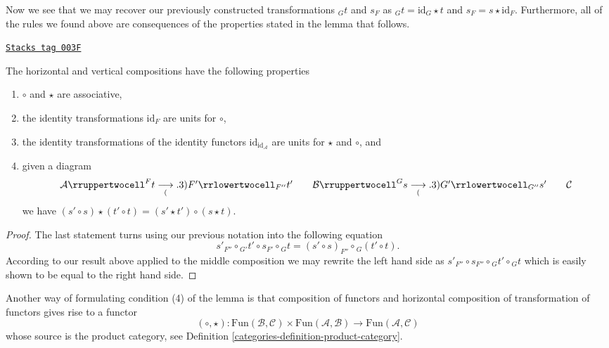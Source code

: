 Now we see that we may recover our previously constructed
transformations ${}_Gt$ and $s_F$ as
$ {}_Gt = \text{id}_G \star t $ and $ s_F = s \star \text{id}_F $.
Furthermore, all of the rules we found above are consequences of
the properties stated in the lemma that follows.

\begin{lemma}
\label{categories-lemma-properties-2-cat-cats}
\href{https://stacks.math.columbia.edu/tag/003F}{\texttt{Stacks tag 003F}}

The horizontal and vertical compositions have the following
properties
\begin{enumerate}
\item $\circ$ and $\star$ are associative,
\item the identity transformations $\text{id}_F$
are units for $\circ$,
\item the identity transformations of the identity functors
$\text{id}_{\text{id}_\mathcal{A}}$
are units for $\star$ and $\circ$, and
\item given a diagram
$$
\begin{array}{ccccc}\mathcal{A}
\rruppertwocell^F{t}
\underset{(}{\longrightarrow}.3){F'}
\rrlowertwocell_{F''}{t'} &  & \mathcal{B}
\rruppertwocell^G{s}
\underset{(}{\longrightarrow}.3){G'}
\rrlowertwocell_{G''}{s'} &  & \mathcal{C}\end{array}
$$
we have $ (s' \circ s) \star (t' \circ t) = (s' \star t') \circ (s \star t)$.
\end{enumerate}
\end{lemma}

\begin{proof}
The last statement turns using our previous notation into the following
equation
$$
s'_{F''}
\circ
{}_{G'}t'
\circ
s_{F'}
\circ
{}_Gt
=
(s' \circ s)_{F''}
\circ
{}_G(t' \circ t).
$$
According to our result above applied to the middle composition
we may rewrite the left hand side as
$
s'_{F''}
\circ
s_{F''}
\circ
{}_Gt'
\circ
{}_Gt
$
which is easily shown to be equal to the right hand side.
\end{proof}

Another way of formulating condition (4) of the lemma is
that composition of functors and horizontal composition
of transformation of functors gives rise to a functor
$$
(\circ, \star) :
\text{Fun}(\mathcal{B}, \mathcal{C})
\times
\text{Fun}(\mathcal{A}, \mathcal{B})
\longrightarrow
\text{Fun}(\mathcal{A}, \mathcal{C})
$$
whose source is the product category,
see Definition \ref{categories-definition-product-category}.

